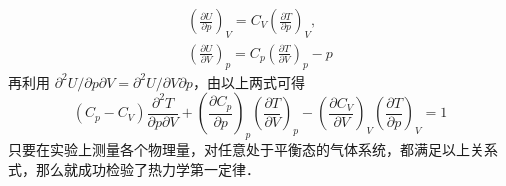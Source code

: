 \begin{align}
\left(\frac{\partial U}{\partial p}\right)_V=C_V\left(\frac{\partial T}{\partial p}\right)_V,\\ 
\left(\frac{\partial U}{\partial V}\right)_p=C_p\left(\frac{\partial T}{\partial V}\right)_p-p
\end{align}
再利用 $\partial^2 U/\partial p\partial V=\partial^2 U/\partial V\partial p$，由以上两式可得
\begin{equation}
(C_p-C_V)\frac{\partial^2T}{\partial p\partial V}+\left(\frac{\partial C_p}{\partial p}\right)_p\left(\frac{\partial T}{\partial V}\right)_p-\left(\frac{\partial C_V}{\partial V}\right)_V\left(\frac{\partial T}{\partial p}\right)_V=1
\end{equation}
只要在实验上测量各个物理量，对任意处于平衡态的气体系统，都满足以上关系式，那么就成功检验了热力学第一定律．